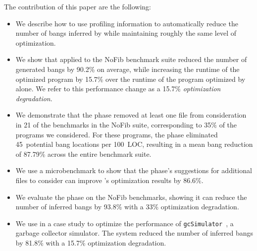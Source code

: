 The contribution of this paper are the following:
\begin{itemize}
  \item We describe how to use profiling information to automatically reduce the number
    of bangs inferred by \Ao{} while maintaining roughly the same
    level of optimization.
  \item We show that \At{} applied to the NoFib benchmark suite reduced
    the number of generated bangs by 90.2\% on average, while
    increasing the runtime of the optimized program by 15.7\% over the
    runtime of the program optimized by \Ao{} alone. We refer to this
    performance change as a 15.7\% \textit{optimization degradation}.
  \item We demonstrate that the \preopt{} phase removed at least
    one file from consideration in 21 of the benchmarks in the NoFib
    suite, corresponding to 35\% of the programs we considered.
    For these programs, the \preopt{} phase eliminated
    45~potential bang locations per 100~LOC, resulting in a mean bang
    reduction of 87.79\% across the entire benchmark suite.
  \item We use a microbenchmark to show that the \preopt{} phase's
    suggestions for additional files to consider can improve \Ao{}'s
    optimization results by 86.6\%.
  \item We evaluate the \postopt{} phase on the NoFib benchmarks,
    showing it can reduce the number of inferred bangs by
    93.8\% with a 33\% optimization degradation.
  \item We use \At{} in a case study to optimize the performance of
    \texttt{gcSimulator}~\cite{Ricci13}, a garbage collector
    simulator. The system reduced the number of inferred bangs by
    81.8\% with a 15.7\% optimization degradation.
\end{itemize}
